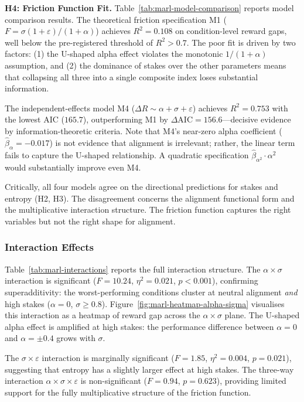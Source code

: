 \textbf{H4: Friction Function Fit.} Table~\ref{tab:marl-model-comparison} reports model comparison results. The theoretical friction specification M1 ($F = \sigma(1+\varepsilon)/(1+\alpha)$) achieves $R^2 = 0.108$ on condition-level reward gaps, well below the pre-registered threshold of $R^2 > 0.7$. The poor fit is driven by two factors: (1) the U-shaped alpha effect violates the monotonic $1/(1+\alpha)$ assumption, and (2) the dominance of stakes over the other parameters means that collapsing all three into a single composite index loses substantial information.

The independent-effects model M4 ($\Delta R \sim \alpha + \sigma + \varepsilon$) achieves $R^2 = 0.753$ with the lowest AIC ($165.7$), outperforming M1 by $\Delta\text{AIC} = 156.6$---decisive evidence by information-theoretic criteria. Note that M4's near-zero alpha coefficient ($\hat{\beta}_\alpha = -0.017$) is not evidence that alignment is irrelevant; rather, the linear term fails to capture the U-shaped relationship. A quadratic specification $\hat{\beta}_{\alpha^2} \cdot \alpha^2$ would substantially improve even M4.

Critically, all four models agree on the directional predictions for stakes and entropy (H2, H3). The disagreement concerns the alignment functional form and the multiplicative interaction structure. The friction function captures the right variables but not the right shape for alignment.

\subsubsection{Interaction Effects}

Table~\ref{tab:marl-interactions} reports the full interaction structure. The $\alpha \times \sigma$ interaction is significant ($F = 10.24$, $\eta^2 = 0.021$, $p < 0.001$), confirming superadditivity: the worst-performing conditions cluster at neutral alignment \emph{and} high stakes ($\alpha = 0$, $\sigma \geq 0.8$). Figure~\ref{fig:marl-heatmap-alpha-sigma} visualises this interaction as a heatmap of reward gap across the $\alpha \times \sigma$ plane. The U-shaped alpha effect is amplified at high stakes: the performance difference between $\alpha = 0$ and $\alpha = \pm 0.4$ grows with $\sigma$.

The $\sigma \times \varepsilon$ interaction is marginally significant ($F = 1.85$, $\eta^2 = 0.004$, $p = 0.021$), suggesting that entropy has a slightly larger effect at high stakes. The three-way interaction $\alpha \times \sigma \times \varepsilon$ is non-significant ($F = 0.94$, $p = 0.623$), providing limited support for the fully multiplicative structure of the friction function.

